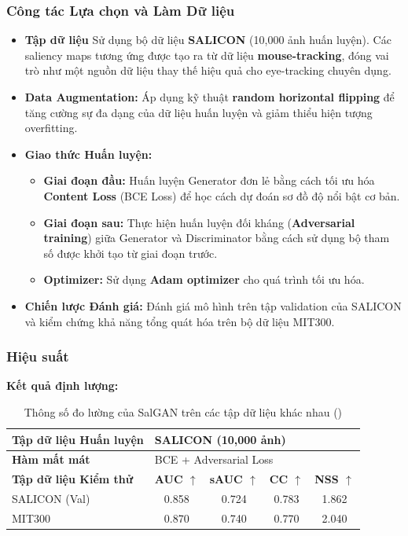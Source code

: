 \subsubsection{Công tác Lựa chọn và Làm Dữ liệu}
\begin{itemize}
    \item \textbf{Tập dữ liệu} Sử dụng bộ dữ liệu \textbf{SALICON} (10,000 ảnh huấn luyện). Các saliency maps tương ứng được tạo ra từ dữ liệu \textbf{mouse-tracking}, đóng vai trò như một nguồn dữ liệu thay thế hiệu quả cho eye-tracking chuyên dụng.

    \item \textbf{Data Augmentation:} Áp dụng kỹ thuật \textbf{random horizontal flipping} để tăng cường sự đa dạng của dữ liệu huấn luyện và giảm thiểu hiện tượng overfitting.

    \item \textbf{Giao thức Huấn luyện:}
    \begin{itemize}
        \item \textbf{Giai đoạn đầu:} Huấn luyện Generator đơn lẻ bằng cách tối ưu hóa \textbf{Content Loss} (BCE Loss) để học cách dự đoán sơ đồ độ nổi bật cơ bản.
        \item \textbf{Giai đoạn sau:} Thực hiện huấn luyện đối kháng (\textbf{Adversarial training}) giữa Generator và Discriminator bằng cách sử dụng bộ tham số được khởi tạo từ giai đoạn trước.
        \item \textbf{Optimizer:} Sử dụng \textbf{Adam optimizer} cho quá trình tối ưu hóa.
    \end{itemize}

    \item \textbf{Chiến lược Đánh giá:} Đánh giá mô hình trên tập validation của SALICON và kiểm chứng khả năng tổng quát hóa trên bộ dữ liệu MIT300.
\end{itemize}

\subsubsection{Hiệu suất}

\textbf{Kết quả định lượng:} 

\begin{table}[h]
\centering
\caption{Thông số đo lường của SalGAN trên các tập dữ liệu khác nhau (\cite{salgan_2017})}
\begin{tabular}{|l|c|c|c|c|}
\hline
\textbf{Tập dữ liệu Huấn luyện} & \multicolumn{4}{l|}{SALICON (10,000 ảnh)} \\ \hline
\textbf{Hàm mất mát} & \multicolumn{4}{l|}{BCE + Adversarial Loss} \\ \hline
\hline
\textbf{Tập dữ liệu Kiểm thử} & \textbf{AUC $\uparrow$} & \textbf{sAUC $\uparrow$} & \textbf{CC $\uparrow$} & \textbf{NSS $\uparrow$} \\ \hline
SALICON (Val) & 0.858 & 0.724 & 0.783 & 1.862 \\ \hline
MIT300 & 0.870 & 0.740 & 0.770 & 2.040 \\ \hline
\end{tabular}
\end{table}

